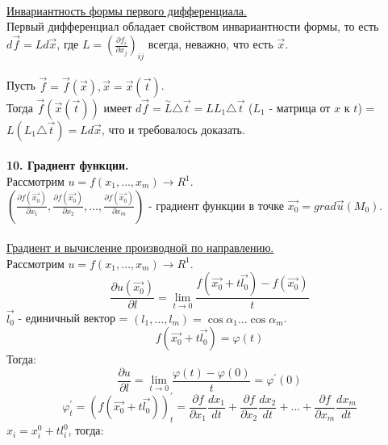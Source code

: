 \documentclass[12pt]{article}
\begin{document}
\\
\label{question9_2}\underline{Инвариантность формы первого дифференциала.}\\
Первый дифференциал обладает свойством инвариантности формы, то есть $d\overrightarrow{f} = L d\overrightarrow{x}$, где $L = (\frac{\partial f_i}{\partial x_j})_{ij}$ всегда, неважно, что есть $\overrightarrow{x}$.\\
\\
Пусть $\overrightarrow{f} = \overrightarrow{f}(\overrightarrow{x}), \overrightarrow{x} = \overrightarrow{x}(\overrightarrow{t})$.\\
Тогда $\overrightarrow{f}(\overrightarrow{x}(\overrightarrow{t}))$ имеет $d\overrightarrow{f} = \overset{\sim}{L} {\bigtriangleup \overrightarrow{t}} = LL_1{\bigtriangleup\overrightarrow{t}}$ ($L_1$ - матрица от $x$ к $t$) = $L(L_1{\bigtriangleup\overrightarrow{t}}) = Ld\overrightarrow{x}$, что и требовалось доказать.\\
\\
\label{question10_1}\textbf{10. Градиент функции.}\\
Рассмотрим $u = f(x_1,\dots,x_m) \to R^1$.\\
$(\frac{\partial f(\overrightarrow{x_0})}{\partial x_1}, \frac{\partial f(\overrightarrow{x_0})}{\partial x_2}, \dots, \frac{\partial f(\overrightarrow{x_0})}{\partial x_m})$ - градиент функции в точке $\overrightarrow{x_0} = grad\overrightarrow{u}(M_0)$.\\
\\
\label{question10_2}\underline{Градиент и вычисление производной по направлению.}\\
Рассмотрим $u = f(x_1,\dots,x_m) \to R^1$.\\
$$\frac{\partial u(\overrightarrow{x_0})}{\partial l} = \lim_{t\to 0} \frac{f(\overrightarrow{x_0}+t\overrightarrow{l_0})-f(\overrightarrow{x_0})}{t}$$
$\overrightarrow{l_0}$ - единичный вектор = $(l_1, \dots, l_m) = \cos{\alpha_1} \dots \cos{\alpha_m}$.\\
$$f(\overrightarrow{x_0}+t\overrightarrow{l_0}) = \varphi(t)$$
Тогда:\\ $$\frac{\partial u}{\partial l} = \lim_{t\to 0} \frac{\varphi(t) - \varphi(0)}{t} = \varphi^{'}(0)$$
$$\varphi^{'}_t = (f(\overrightarrow{x_0}+t\overrightarrow{l_0}))^{'}_t = \frac{\partial f}{\partial x_1} \frac{d x_1}{d t} + \frac{\partial f}{\partial x_2} \frac{d x_2}{d t} + \dots + \frac{\partial f}{\partial x_m} \frac{d x_m}{d t}$$
$x_i = x_i^0 + tl_i^0$, тогда:\\
\end{document}
